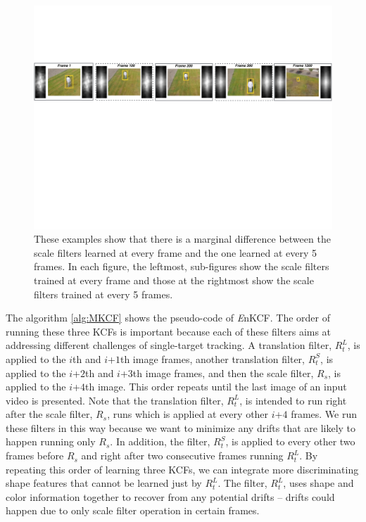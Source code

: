 \documentclass[10pt,twocolumn,letterpaper]{article}
\begin{document}
\begin{figure}[!h]
\centering
\includegraphics[width=1\textwidth]{./figures/LearnedFiltersComparison2.pdf}
\caption{These examples show that there is a marginal difference
  between the scale filters learned at every frame and the one learned
  at every 5 frames. In each figure, the leftmost, sub-figures show
  the scale filters trained at every frame and those at the rightmost
  show the scale filters trained at every 5 frames.}
\label{fig:Filters_Comparison}
\end{figure}

The algorithm \ref{alg:MKCF} shows the pseudo-code of {\it E}nKCF.
The order of running these three KCFs is important because each of
these filters aims at addressing different challenges of single-target
tracking. A translation filter, $R_{t}^{L}$, is applied to the $i$th
and $i$+$1$th image frames, another translation filter, $R_{t}^{S}$,
is applied to the $i$+$2$th and $i$+$3$th image frames, and then the
scale filter, $R_{s}$, is applied to the $i$+$4$th image. This order
repeats until the last image of an input video is presented. Note that
the translation filter, $R_{t}^{L}$, is intended to run right after
the scale filter, $R_s$, runs which is applied at every other $i$+$4$
frames. We run these filters in this way because we want to minimize
any drifts that are likely to happen running only $R_{s}$. In
addition, the filter, $R_{t}^{S}$, is applied to every other two
frames before $R_{s}$ and right after two consecutive frames running
$R_{t}^{L}$. By repeating this order of learning three KCFs, we can
integrate more discriminating shape features that cannot be learned
just by $R_{t}^{L}$. The filter, $R_{t}^{L}$, uses shape and color
information together to recover from any potential drifts -- drifts
could happen due to only scale filter operation in certain frames.
\end{document}
